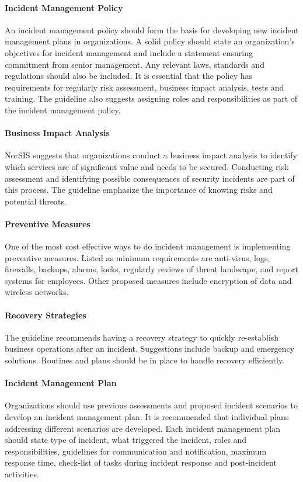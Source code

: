 \paragraph{Incident Management Policy} 
An incident management policy should form the basis for developing new incident management plans in organizations. A solid policy should state an organization's objectives for incident management and include a statement ensuring commitment from senior management. Any relevant laws, standards and regulations should also be included. It is essential that the policy has requirements for regularly risk assessment, business impact analysis, tests and training. The guideline also suggests assigning roles and responsibilities as part of the incident management policy.

\paragraph{Business Impact Analysis}
NorSIS suggests that organizations conduct a business impact analysis to identify which services are of significant value and needs to be secured. Conducting risk assessment and identifying possible consequences of security incidents are part of this process. The guideline emphasize the importance of knowing risks and potential threats.  

\paragraph{Preventive Measures}
One of the most cost effective ways to do incident management is implementing preventive measures. Listed as minimum requirements are anti-virus, logs, firewalls, backups, alarms, locks, regularly reviews of threat landscape, and report systems for employees. Other proposed measures include encryption of data and wireless networks.   

\paragraph{Recovery Strategies}
The guideline recommends having a recovery strategy to quickly re-establish business operations after an incident. Suggestions include backup and emergency solutions. Routines and plans should be in place to handle recovery efficiently.

\paragraph{Incident Management Plan}
Organizations should use previous assessments and proposed incident scenarios to develop an incident management plan. It is recommended that individual plans addressing different scenarios are developed. Each incident management plan should state type of incident, what triggered the incident, roles and responsibilities, guidelines for communication and notification, maximum response time, check-list of tasks during incident response and post-incident activities.

